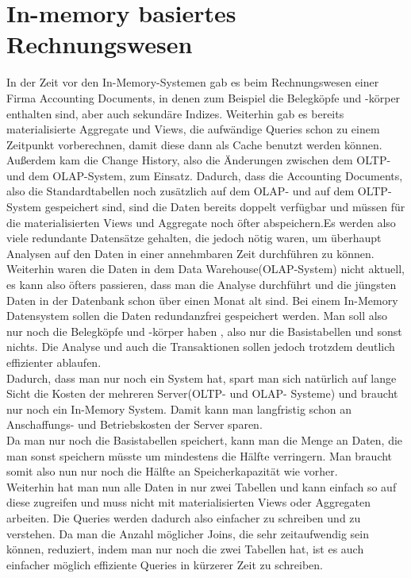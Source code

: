 %
\section{In-memory basiertes Rechnungswesen}
In der Zeit vor den In-Memory-Systemen gab es beim Rechnungswesen einer Firma Accounting Documents, in denen zum Beispiel die Belegköpfe und -körper enthalten sind, aber auch sekundäre Indizes. Weiterhin gab es bereits materialisierte Aggregate und Views, die aufwändige Queries schon zu einem Zeitpunkt vorberechnen, damit diese dann als Cache benutzt werden können. Außerdem kam die Change History, also die Änderungen zwischen dem OLTP- und dem OLAP-System, zum Einsatz. Dadurch, dass die Accounting Documents, also die Standardtabellen noch zusätzlich auf dem OLAP- und auf dem OLTP-System gespeichert sind, sind die Daten bereits doppelt verfügbar und müssen für die materialisierten Views und Aggregate noch öfter abspeichern.Es werden also viele redundante Datensätze gehalten, die jedoch nötig waren, um überhaupt Analysen auf den Daten in einer annehmbaren Zeit durchführen zu können.
\\
Weiterhin waren die Daten in dem Data Warehouse(OLAP-System) nicht aktuell, es kann also öfters passieren, dass man die Analyse durchführt und die jüngsten Daten in der Datenbank schon über einen Monat alt sind.
Bei einem In-Memory Datensystem sollen die Daten redundanzfrei gespeichert werden. Man soll also nur noch die Belegköpfe und -körper haben , also nur die Basistabellen und sonst nichts. Die Analyse und auch die Transaktionen sollen jedoch trotzdem deutlich effizienter ablaufen.
\\
Dadurch, dass man nur noch ein System hat, spart man sich natürlich auf lange Sicht die Kosten der mehreren Server(OLTP- und OLAP- Systeme) und braucht nur noch ein In-Memory System. Damit kann man langfristig schon an Anschaffungs- und Betriebskosten der Server sparen.
\\
Da man nur noch die Basistabellen speichert, kann man die Menge an Daten, die man sonst speichern müsste um mindestens die Hälfte verringern. Man braucht somit also nun nur noch die Hälfte an Speicherkapazität wie vorher.
\\
Weiterhin hat man nun alle Daten in nur zwei Tabellen und kann einfach so auf diese zugreifen und muss nicht mit materialisierten Views oder Aggregaten arbeiten. Die Queries werden dadurch also einfacher zu schreiben und zu verstehen. Da man die Anzahl möglicher Joins, die sehr zeitaufwendig sein können, reduziert, indem man nur noch die zwei Tabellen hat, ist es auch einfacher möglich effiziente Queries in kürzerer Zeit zu schreiben.

